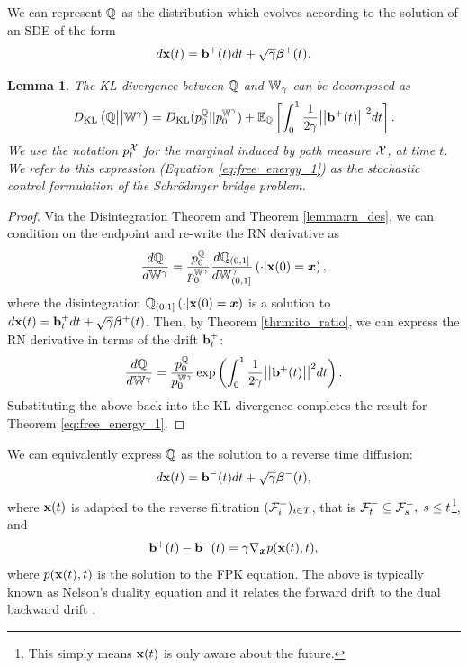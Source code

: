 \documentclass[a4paper,12pt,twoside,openright]{report}
\newtheorem{lemma}{Lemma}
\theoremstyle{definition}
\begin{document}
We can represent ${\mathbb{Q}}$ as the distribution which evolves according to the solution of an SDE of the form
\begin{align*}
    d{\mathbf{x}}(t) = {\mathbf{b}}^{+}(t) dt + \sqrt{\gamma} {\bm{\beta}}^+(t).
\end{align*}
\begin{lemma}\citep{pavon1991free}
    The KL divergence between ${\mathbb{Q}}$ and $\mathbb{W}_{\gamma}$ can be decomposed as
\begin{align}\label{eq:free_energy_1}
     D_{\mathrm{KL}}\left({\mathbb{Q}} \big|\big| \mathbb{W}^{\gamma}\right) = D_{\mathrm{KL}}(p^{{\mathbb{Q}}}_0 || p_0^{ \mathbb{W}^{\gamma}}) + \mathbb{E}_{\mathbb{Q}}\left[\int_0^1 \frac{1}{2\gamma}\big|\big|{\mathbf{b}}^{+}(t) \big|\big|^2 dt\right].
\end{align}
We use the notation $p^{{\mathcal{X}}}_t$ for the marginal induced by path measure ${\mathcal{X}}$, at time $t$. We refer to this expression (Equation \ref{eq:free_energy_1}) as the stochastic control formulation of the Schrödinger bridge problem.
\end{lemma}
\begin{proof}
Via the Disintegration Theorem and Theorem \ref{lemma:rn_des}, we can condition on the endpoint and re-write the RN derivative as
\begin{align*}
    \frac{d{\mathbb{Q}}}{d\mathbb{W}^{ \gamma}} = \frac{p_0^{\mathbb{Q}}}{p_0^{ \mathbb{W}^{\gamma}}} \frac{d{\mathbb{Q}}_{(0,1]}}{d\mathbb{W}_{(0,1]}^{\gamma}}\left(\cdot | {\mathbf{x}}(0) ={\bm{x}}\right),
\end{align*}
where the disintegration ${\mathbb{Q}}_{(0,1]}\left(\cdot | {\mathbf{x}}(0) = {\bm{x}} \right)$ is a solution to $d{\mathbf{x}}(t) = {\mathbf{b}}_t^+ dt + \sqrt{\gamma} {\bm{\beta}}^+(t)$. Then, by Theorem \ref{thrm:ito_ratio}, we can express the RN derivative in terms of  the drift ${\mathbf{b}}_t^+$:
\begin{align*}
    \frac{d{\mathbb{Q}}}{d\mathbb{W}^{\gamma}} = \frac{p_0^{\mathbb{Q}}}{p_0^{ \mathbb{W}^{\gamma}}}\exp\left(\int_0^1\frac{1}{2\gamma} \big|\big|{\mathbf{b}}^+(t)\big|\big|^2 dt\right).
\end{align*}
Substituting the above back into the KL divergence completes the result for Theorem \ref{eq:free_energy_1}.
\end{proof}
 We can equivalently express ${\mathbb{Q}}$ as the solution to a reverse time diffusion:
\begin{align}
    d{\mathbf{x}}(t) = {\mathbf{b}}^{-}(t) dt + \sqrt{\gamma} {\bm{\beta}}^{-}(t), 
\end{align}
where ${\mathbf{x}}(t)$ is adapted to the reverse filtration $({\mathcal{F}}^{-}_i)_{i\in T}$, that is ${\mathcal{F}}^{-}_t \subseteq {\mathcal{F}}^{-}_s, \; s \leq t$\footnote{This simply means ${\mathbf{x}}(t)$ is only aware about the future.}, and
\begin{align}\label{eq:nelson}
    {{\mathbf{b}}^{+}(t) - {\mathbf{b}}^{-}(t)} =\gamma \nabla_{{\bm{x}}} p({\mathbf{x}}(t), t),
\end{align}
where $p({\mathbf{x}}(t), t)$ is the solution to the FPK equation. The above is typically known as Nelson's duality equation and it relates the forward drift to the dual backward drift \citep{nelson1967dynamical}. 
\end{document}
